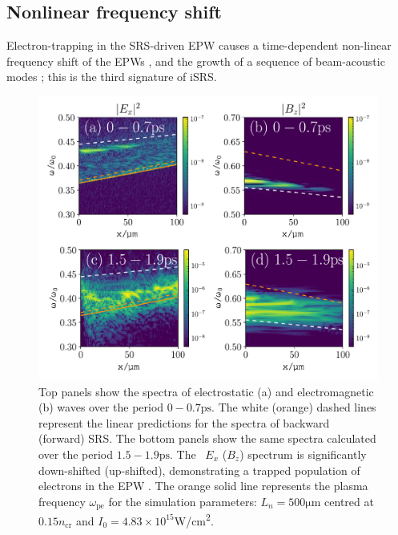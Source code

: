 \subsection{Nonlinear frequency shift}
Electron-trapping in the SRS-driven EPW causes a time-dependent non-linear frequency shift of
the EPWs \cite{Morales1972,Kline2006}, and the growth of a sequence of beam-acoustic modes \cite{Yin2006}; this is the third signature of iSRS.

\begin{figure}[h!]
    \centering
    \includegraphics[width=0.9\columnwidth]{Chapters/C4_iSRS/fig4_4a_4b_4c_4d.pdf}
    \caption{Top panels show the spectra of electrostatic (a) and electromagnetic (b) waves over the period $0-0.7\si{\pico\second}$.
    The white (orange) dashed lines represent the linear predictions for the spectra of backward (forward) SRS. The bottom panels show the same spectra calculated over the period $1.5-1.9\si{\pico\second}$. The \
$E_x$ ($B_z$)
    spectrum is significantly down-shifted (up-shifted), demonstrating a trapped population of electrons in the EPW \cite{Yin2006}.
    The orange solid line represents the plasma frequency $\omega_{\mathrm{pe}}$ for the simulation parameters: $L_n = 500 \si{\micro\metre} $ centred at $0.15n_\mathrm{cr}$ and $I_0 = 4.83\times10^{15}$\si{W/\centi\metre^2}.}
    \label{fig:downshift}
\end{figure}{}

